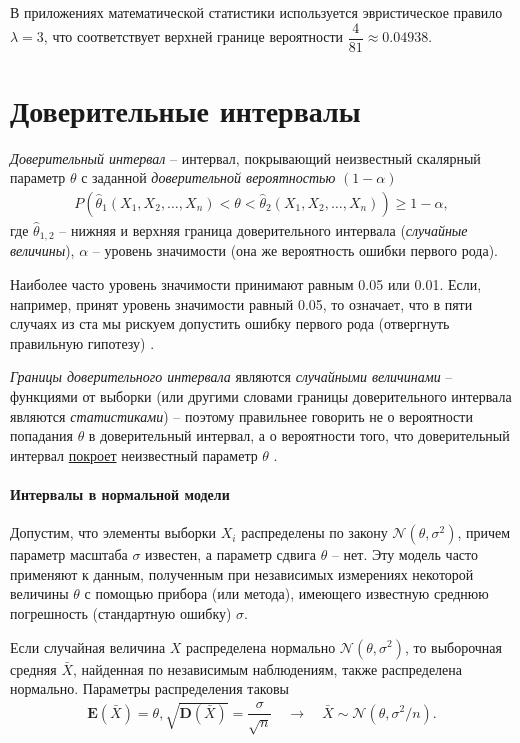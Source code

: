 \documentclass[%
	11pt,
	a4paper,
	utf8,
		]{article}
\begin{document}
В приложениях математической статистики используется эвристическое правило $ \lambda = 3 $, что соответствует верхней границе вероятности $ \dfrac{4}{81} \approx 0.04938 $.


\section{Доверительные интервалы}

\emph{Доверительный интервал} -- интервал, покрывающий неизвестный скалярный параметр $ \theta $ с заданной \emph{доверительной вероятностью} $ (1 - \alpha) $
\begin{align*}
	P(\hat{\theta}_1(X_1, X_2, \dots, X_n) < \theta < \hat{\theta}_2(X_1, X_2, \dots, X_n)) \geqslant 1 - \alpha,
\end{align*}
где $ \hat{\theta}_{1,2} $ -- нижняя и верхняя граница доверительного интервала (\emph{случайные величины}), $ \alpha $ -- уровень значимости (она же вероятность ошибки первого рода).

Наиболее часто уровень значимости принимают равным 0.05 или 0.01. Если, например, принят уровень значимости равный 0.05, то означает, что в пяти случаях из ста мы рискуем допустить ошибку первого рода (отвергнуть правильную гипотезу) \cite[284]{gmurman:1972}.

\emph{Границы доверительного интервала} являются \emph{случайными величинами} -- функциями от выборки (или другими словами границы доверительного интервала являются \emph{статистиками}) -- поэтому правильнее говорить не о вероятности попадания $ \theta $ в доверительный интервал, а о вероятности того, что доверительный интервал \underline{покроет} неизвестный параметр $ \theta $ \cite[216]{gmurman:1972}.

\paragraph{Интервалы в нормальной модели} Допустим, что элементы выборки $ X_i $ распределены по закону $ \mathcal{N}(\theta, \sigma^2) $, причем параметр масштаба $ \sigma $ известен, а параметр сдвига $ \theta $ -- нет. Эту модель часто применяют к данным, полученным при независимых измерениях некоторой величины $ \theta $ с помощью прибора (или метода), имеющего известную среднюю погрешность (стандартную ошибку) $ \sigma $.

Если случайная величина $ X $ распределена нормально $ \mathcal{N}(\theta, \sigma^2) $, то выборочная средняя $ \bar{X} $, найденная по независимым наблюдениям, также распределена нормально. Параметры распределения таковы \cite{gmurman:1972}
\begin{align*}
	\mathbf{E}(\bar{X}) = \theta, \sqrt{\mathbf{D}(\bar{X})} = \dfrac{\sigma}{\sqrt{n}} \quad \to \quad \bar{X} \sim \mathcal{N}(\theta, \sigma^2/n).
\end{align*}
\end{document}
